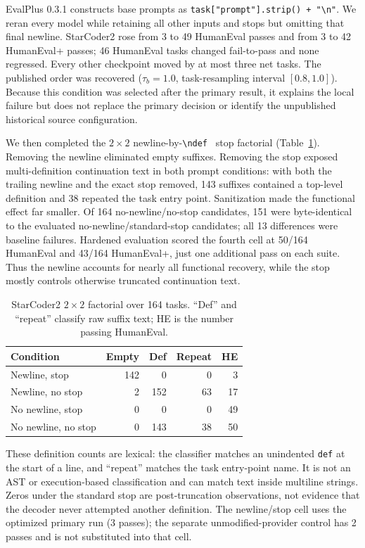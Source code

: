 \documentclass[10pt,conference]{IEEEtran}
\begin{document}
EvalPlus 0.3.1 constructs base prompts as
\verb|task["prompt"].strip() + "\n"|. We reran every model while retaining all
other inputs and stops but omitting that final newline. StarCoder2 rose from
3 to 49 HumanEval passes and from 3 to 42 HumanEval+ passes; 46 HumanEval tasks
changed fail-to-pass and none regressed. Every other checkpoint moved by at
most three net tasks. The published order was recovered ($\tau_b=1.0$,
task-resampling interval $[0.8,1.0]$). Because this condition was selected after
the primary result, it explains the local failure but does not replace the
primary decision or identify the unpublished historical source configuration.

We then completed the $2\times2$ newline-by-\verb|\ndef | stop factorial
(Table~\ref{tab:factorial}). Removing the newline eliminated empty suffixes.
Removing the stop exposed multi-definition continuation text in both prompt
conditions: with both the trailing newline and the exact stop removed, 143 suffixes contained a top-level
definition and 38 repeated the task entry point. Sanitization made the
functional effect far smaller. Of 164 no-newline/no-stop candidates, 151 were
byte-identical to the evaluated no-newline/standard-stop candidates; all 13
differences were baseline failures. Hardened evaluation scored the fourth cell
at 50/164 HumanEval and 43/164 HumanEval+, just one additional pass on each
suite. Thus the newline accounts for nearly all functional recovery, while the
stop mostly controls otherwise truncated continuation text.

\begin{table}[t]
\caption{StarCoder2 $2\times2$ factorial over 164 tasks. ``Def'' and ``repeat''
classify raw suffix text; HE is the number passing HumanEval.}
\label{tab:factorial}
\centering
\small
\begin{tabular}{lrrrr}
\toprule
Condition & Empty & Def & Repeat & HE \\
\midrule
Newline, stop & 142 & 0 & 0 & 3 \\
Newline, no stop & 2 & 152 & 63 & 17 \\
No newline, stop & 0 & 0 & 0 & 49 \\
No newline, no stop & 0 & 143 & 38 & 50 \\
\bottomrule
\end{tabular}
\end{table}

These definition counts are lexical: the classifier matches an unindented
\texttt{def} at the start of a line, and ``repeat'' matches the task entry-point
name. It is not an AST or execution-based classification and can match text
inside multiline strings. Zeros under the standard stop are post-truncation
observations, not evidence that the decoder never attempted another definition.
The newline/stop cell uses the optimized primary run (3 passes); the separate
unmodified-provider control has 2 passes and is not substituted into that cell.
\end{document}
